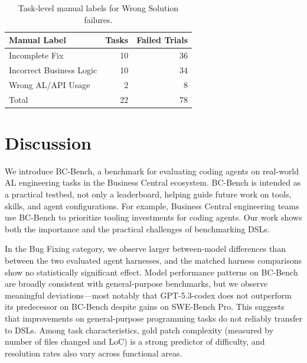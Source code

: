 \documentclass{article}
\begin{document}
\begin{table}[t]
\vskip 0.05in
\begin{center}
\begin{small}
\begin{sc}
\begin{tabular}{lrr}
\toprule
\textbf{Manual Label} & \textbf{Tasks} & \textbf{Failed Trials} \\
\midrule
Incomplete Fix          & 10 & 36 \\
Incorrect Business Logic & 10 & 34 \\
Wrong AL/API Usage      &  2 &  8 \\
\midrule
Total                   & 22 & 78 \\
\bottomrule
\end{tabular}
\end{sc}
\end{small}
\end{center}
\caption{Task-level manual labels for Wrong Solution failures.}
\label{tab:wrong_solution_manual_labels}
\vskip 0.1in
\end{table}

\section{Discussion}

We introduce BC-Bench, a benchmark for evaluating coding agents on real-world AL engineering tasks in the Business Central ecosystem. BC-Bench is intended as a practical testbed, not only a leaderboard, helping guide future work on tools, skills, and agent configurations. For example, Business Central engineering teams use BC-Bench to prioritize tooling investments for coding agents. Our work shows both the importance and the practical challenges of benchmarking DSLs.

In the Bug Fixing category, we observe larger between-model differences than between the two evaluated agent harnesses, and the matched harness comparisons show no statistically significant effect. Model performance patterns on BC-Bench are broadly consistent with general-purpose benchmarks, but we observe meaningful deviations---most notably that GPT-5.3-codex does not outperform its predecessor on BC-Bench despite gains on SWE-Bench Pro. This suggests that improvements on general-purpose programming tasks do not reliably transfer to DSLs. Among task characteristics, gold patch complexity (measured by number of files changed and LoC) is a strong predictor of difficulty, and resolution rates also vary across functional areas.
\end{document}
